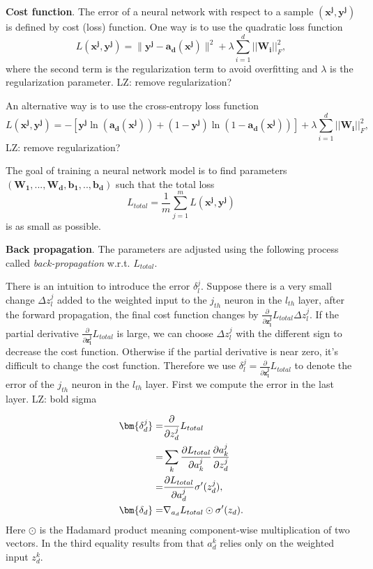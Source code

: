 {\bf Cost function}.
The error of a neural network with respect to a sample $(\bm{x^j, y^j})$ is defined by cost (loss) function. One way is to use the quadratic loss function
\begin{equation}
L(\bm{x^j, y^j}) =\|\bm{y^j} - \bm{a_d}(\bm{x^j})\|^2+\lambda \sum_{i=1}^d ||\bm{W_i}||_F^2,
\end{equation}
where the second term is the regularization term to avoid overfitting and $\lambda$ is the regularization parameter.{\color{red} LZ: remove regularization?}

An alternative way is to use the cross-entropy loss function
\begin{equation}
L(\bm{x^j, y^j}) = -[\bm{y^j} \ln (\bm{a_d}(\bm{x^j}))+(1-\bm{y^j}) \ln (1-\bm{a_d}(\bm{x^j}))]+\lambda \sum_{i=1}^d ||\bm{W_i}||_F^2,
\end{equation}
{\color{red} LZ: remove regularization?}

The goal of training a neural network model is to find parameters $(\bm{W_1},...,\bm{W_d},\bm{b_1},..,\bm{b_d})$ such that the total loss
\begin{equation}
\label{etotalloss}
L_{total} = \frac{1}{m} \sum_{j=1}^m L(\bm{x^j, y^j})
\end{equation}
is as small as possible.

{\bf Back propagation}.
The parameters are adjusted using the following process called \textit{back-propagation} w.r.t. $L_{total}$.

There is an intuition to introduce the error $\delta_l^j$.
Suppose there is a very small change $\Delta z_l^j$ added to the weighted input to the $j_{th}$ neuron in the $l_{th}$ layer, after the forward propagation, the final cost function changes by $\frac{\partial}{\partial \bm{z_l^j}}L_{total} \Delta z_l^j$. If the partial derivative $\frac{\partial}{\partial \bm{z_l^j}}L_{total}$ is large, we can choose $\Delta z_l^j$ with the different sign to decrease the cost function. Otherwise if the partial derivative is near zero, it's difficult to change the cost function. Therefore we use $\delta_l^j = \frac{\partial}{\partial \bm{z_l^j}}L_{total}$ to denote the error of the $j_{th}$ neuron in the $l_{th}$ layer.
First  we compute the error in the last layer.
{\color{red}LZ: bold sigma}

\begin{equation}
\aligned
\bm{\delta_d^j} =& \frac{\partial}{\partial z_d^j}L_{total}\\
=& \sum_{k} \frac{\partial L_{total}}{\partial a_k^j}\frac{\partial a_k^j}{\partial z_d^j}\\
=& \frac{\partial L_{total}}{\partial a_d^j} \sigma'(z_d^j),\\
\bm{\delta_d} =& \nabla_{a_d} L_{total}\odot \sigma'(z_d).
\endaligned
\end{equation}
Here $\odot$ is the Hadamard product meaning component-wise multiplication of two vectors. In the third equality results from that $a_d^k$ relies only on the weighted input $z_d^k$.

